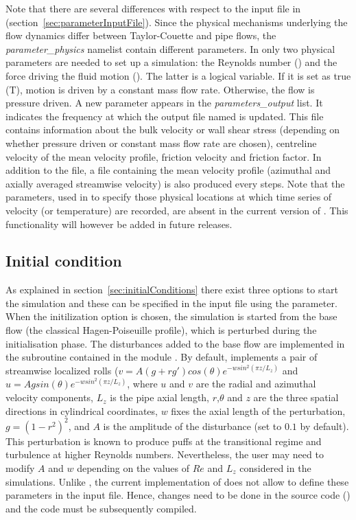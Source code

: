 \documentclass[a4paper, 11pt, DIV=11]{scrartcl}
\begin{document}
Note that there are several differences with respect to the input file  in \nsc
(section~\ref{sec:parameterInputFile}). Since the physical mechanisms underlying
the flow dynamics differ between Taylor-Couette and pipe flows, the
\emph{parameter\_physics} namelist contain different parameters. In \nsp only two
physical parameters are needed to set up a simulation: the Reynolds number () and
the force driving the fluid motion (). The latter is a logical variable.
If it is set as true (T), motion is driven by a constant mass flow rate. Otherwise,
the flow is pressure driven. A new parameter  appears in the
\emph{parameters\_output} list. It indicates the frequency at which the output file named
 is updated. This file contains information about the bulk velocity or wall shear
stress (depending on whether pressure driven or constant mass flow rate are chosen), centreline
velocity of the mean velocity profile, friction velocity and friction factor. In addition to
the  file, a file containing the mean velocity profile (\ie azimuthal and axially
averaged streamwise velocity) is also produced every  steps. Note that the
 parameters,  used in \nsc to specify those physical locations at which time
series of velocity (or temperature) are recorded, are absent in the current version of \nsp.
This functionality will however be added in future releases.

\subsection{Initial condition}
\label{subsec:initial_condition_pipe}

As explained in section~\ref{sec:initialConditions} there exist three options to start
the simulation and these can be specified in the input file using the  parameter.
When the initilization option  is chosen, the simulation is started from
the base flow (the classical Hagen-Poiseuille profile), which is perturbed during the
initialisation phase. The disturbances added to the base flow are implemented in the subroutine
 contained in the module . By default,
\nsp implements a pair of streamwise localized rolls ($v=A(g+rg') cos(\theta) e^{-wsin^2(\pi z/L_z)}$ and
$u=A g sin(\theta) e^{-wsin^2(\pi z/L_z)}$, where $u$ and $v$ are the
radial and azimuthal velocity components, $L_z$ is the pipe axial length,
$r$,$\theta$ and $z$ are the three spatial directions in cylindrical
coordinates, $w$ fixes the axial length of the perturbation,
$g=(1-r^2)^2$,  and $A$ is the amplitude of the
disturbance (set to $0.1$ by default). This perturbation is known to produce puffs at the
transitional regime and turbulence at higher Reynolds numbers.
Nevertheless, the user may need to modify $A$ and $w$
depending on the values of $Re$ and $L_z$ considered in the simulations.
Unlike \nsc, the current implementation of \nsp does not allow
to define these parameters in the input file. Hence, changes need
to be done in the source code () and the
code must be subsequently compiled.
\end{document}
